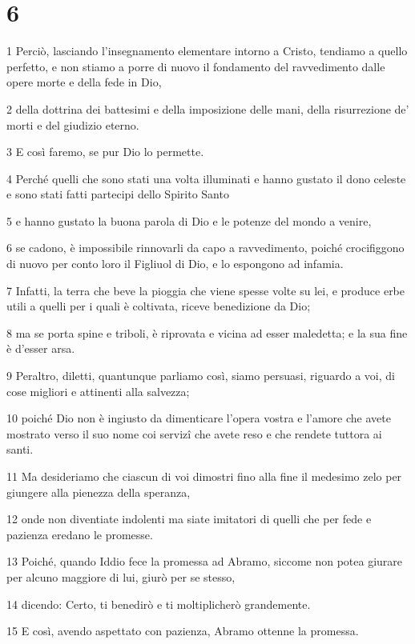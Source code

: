 \chapter{6}

\par 1 Perciò, lasciando l'insegnamento elementare intorno a Cristo, tendiamo a quello perfetto, e non stiamo a porre di nuovo il fondamento del ravvedimento dalle opere morte e della fede in Dio,
\par 2 della dottrina dei battesimi e della imposizione delle mani, della risurrezione de' morti e del giudizio eterno.
\par 3 E così faremo, se pur Dio lo permette.
\par 4 Perché quelli che sono stati una volta illuminati e hanno gustato il dono celeste e sono stati fatti partecipi dello Spirito Santo
\par 5 e hanno gustato la buona parola di Dio e le potenze del mondo a venire,
\par 6 se cadono, è impossibile rinnovarli da capo a ravvedimento, poiché crocifiggono di nuovo per conto loro il Figliuol di Dio, e lo espongono ad infamia.
\par 7 Infatti, la terra che beve la pioggia che viene spesse volte su lei, e produce erbe utili a quelli per i quali è coltivata, riceve benedizione da Dio;
\par 8 ma se porta spine e triboli, è riprovata e vicina ad esser maledetta; e la sua fine è d'esser arsa.
\par 9 Peraltro, diletti, quantunque parliamo così, siamo persuasi, riguardo a voi, di cose migliori e attinenti alla salvezza;
\par 10 poiché Dio non è ingiusto da dimenticare l'opera vostra e l'amore che avete mostrato verso il suo nome coi servizî che avete reso e che rendete tuttora ai santi.
\par 11 Ma desideriamo che ciascun di voi dimostri fino alla fine il medesimo zelo per giungere alla pienezza della speranza,
\par 12 onde non diventiate indolenti ma siate imitatori di quelli che per fede e pazienza eredano le promesse.
\par 13 Poiché, quando Iddio fece la promessa ad Abramo, siccome non potea giurare per alcuno maggiore di lui, giurò per se stesso,
\par 14 dicendo: Certo, ti benedirò e ti moltiplicherò grandemente.
\par 15 E così, avendo aspettato con pazienza, Abramo ottenne la promessa.
